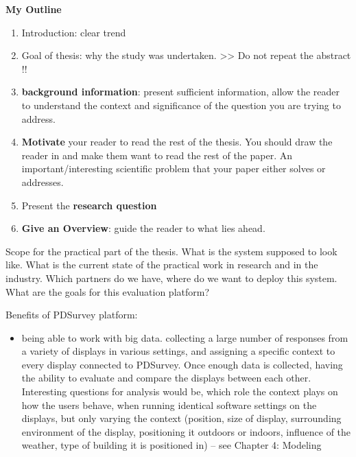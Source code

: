 	\textbf{My Outline}
  
	\begin{enumerate}
		\item Introduction: clear trend
		\item Goal of thesis: why the study was undertaken. >> Do not repeat the abstract !!
		\item \textbf{background information}: present sufficient information, allow the reader to understand the context and significance of the question you are trying to address. 
		\item \textbf{Motivate} your reader to read the rest of the thesis. You should draw the reader in and make them want to read the rest of the paper. An important/interesting scientific problem that your paper either solves or addresses.
		\item Present the \textbf{research question}
		\item \textbf{Give an Overview}: guide the reader to what lies ahead. 
	\end{enumerate}


	Scope for the practical part of the thesis. What is the system supposed to look like. What is the current state of the practical work in research and in the industry. Which partners do we have, where do we want to deploy this system. What are the goals for this evaluation platform?



	Benefits of PDSurvey platform:

	\begin{itemize}
	\item being able to work with big data. collecting a large number of responses from a variety of displays in various settings, and assigning a specific context to every display connected to PDSurvey. Once enough data is collected, having the ability to evaluate and compare the displays between each other. Interesting questions for analysis would be, which role the context plays on how the users behave, when running identical software settings on the displays, but only varying the context (position, size of display, surrounding environment of the display, positioning it outdoors or indoors, influence of the weather, type of building it is positioned in) -- see Chapter 4: Modeling
	\end{itemize}


